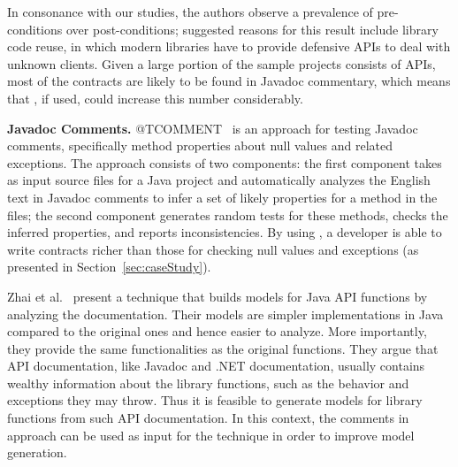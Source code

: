 In consonance with our studies, the authors observe a prevalence of pre-conditions over post-conditions; suggested reasons for this result include library code reuse, in which modern libraries have to provide defensive APIs to deal with unknown clients. Given a large portion of the sample projects consists of APIs, most of the contracts are likely to be found in Javadoc commentary, which means that \contractjdoc{}, if used, could increase this number considerably.

\textbf{Javadoc Comments.}
@TCOMMENT~\cite{atComment} is an approach for testing Javadoc comments, specifically method properties about null values and related exceptions. The approach consists of two components: the first component takes as input source files for a Java project and automatically analyzes the English text in Javadoc comments to
infer a set of likely properties for a method in the files; the second component generates random tests for these methods, checks the inferred properties, and reports inconsistencies. By using
\contractjdoc{}, a developer is able to write contracts richer than those for checking null values and exceptions (as presented in Section~\ref{sec:caseStudy}).

Zhai et al.~\cite{docAnalysis} present a technique that builds models for Java API functions by analyzing the documentation. Their models are simpler implementations in Java compared to the original ones and hence easier to analyze. More importantly, they provide the same functionalities as the original functions. They argue that API documentation, like Javadoc and .NET documentation, usually contains wealthy information about the library functions, such as the behavior and exceptions they may throw. Thus it is feasible to generate models for library functions from such API documentation. In this context, the comments in \contractjdoc{} approach can be used as input for the technique in order to improve model generation.


